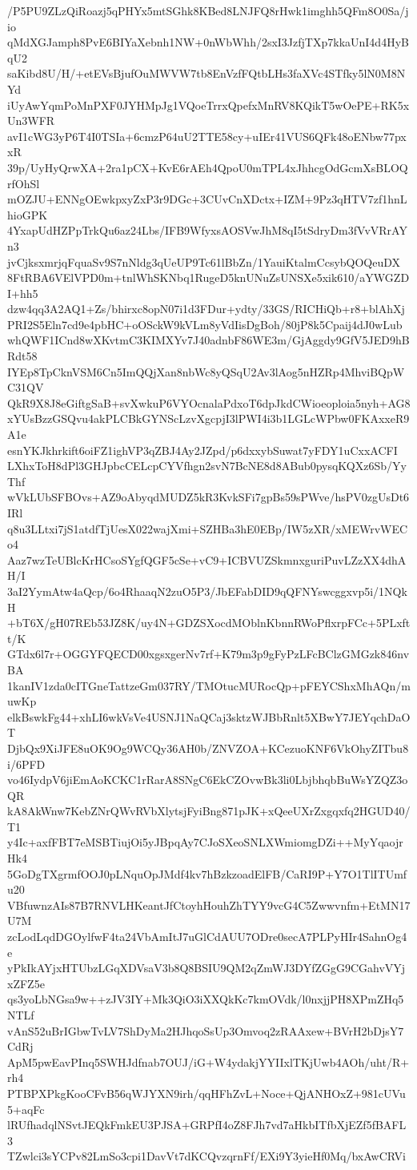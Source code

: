 /P5PU9ZLzQiRoazj5qPHYx5mtSGhk8KBed8LNJFQ8rHwk1imghh5QFm8O0Sa/jio
qMdXGJamph8PvE6BIYaXebnh1NW+0nWbWhh/2sxI3JzfjTXp7kkaUnI4d4HyBqU2
saKibd8U/H/+etEVsBjufOuMWVW7tb8EnVzfFQtbLHs3faXVc4STfky5lN0M8NYd
iUyAwYqmPoMnPXF0JYHMpJg1VQoeTrrxQpefxMnRV8KQikT5wOePE+RK5xUn3WFR
avI1cWG3yP6T4I0TSIa+6cmzP64uU2TTE58cy+uIEr41VUS6QFk48oENbw77pxxR
39p/UyHyQrwXA+2ra1pCX+KvE6rAEh4QpoU0mTPL4xJhhcgOdGcmXsBLOQrfOhSl
mOZJU+ENNgOEwkpxyZxP3r9DGc+3CUvCnXDctx+IZM+9Pz3qHTV7zf1hnLhioGPK
4YxapUdHZPpTrkQu6az24Lbs/IFB9WfyxsAOSVwJhM8qI5tSdryDm3fVvVRrAYn3
jvCjksxmrjqFquaSv9S7nNldg3qUeUP9Tc61lBbZn/1YauiKtalmCcsybQOQeuDX
8FtRBA6VElVPD0m+tnlWhSKNbq1RugeD5knUNuZsUNSXe5xik610/aYWGZDI+hh5
dzw4qq3A2AQ1+Zs/bhirxc8opN07i1d3FDur+ydty/33GS/RICHiQb+r8+blAhXj
PRI2S5Eln7cd9e4pbHC+oOSckW9kVLm8yVdIisDgBoh/80jP8k5Cpaij4dJ0wLub
whQWF1ICnd8wXKvtmC3KIMXYv7J40adnbF86WE3m/GjAggdy9GfV5JED9hBRdt58
IYEp8TpCknVSM6Cn5ImQQjXan8nbWc8yQSqU2Av3lAog5nHZRp4MhviBQpWC31QV
QkR9X8J8eGiftgSaB+svXwkuP6VYOcnalaPdxoT6dpJkdCWioeoploia5nyh+AG8
xYUsBzzGSQvu4akPLCBkGYNScLzvXgcpjI3lPWI4i3b1LGLcWPbw0FKAxxeR9A1e
esnYKJkhrkift6oiFZ1ighVP3qZBJ4Ay2JZpd/p6dxxybSuwat7yFDY1uCxxACFI
LXhxToH8dPl3GHJpbcCELcpCYVfhgn2svN7BcNE8d8ABub0pysqKQXz6Sb/YyThf
wVkLUbSFBOvs+AZ9oAbyqdMUDZ5kR3KvkSFi7gpBs59sPWve/hsPV0zgUsDt6IRl
q8u3LLtxi7jS1atdfTjUesX022wajXmi+SZHBa3hE0EBp/IW5zXR/xMEWrvWECo4
Aaz7wzTeUBlcKrHCsoSYgfQGF5cSe+vC9+ICBVUZSkmnxguriPuvLZzXX4dhAH/I
3aI2YymAtw4aQcp/6o4RhaaqN2zuO5P3/JbEFabDID9qQFNYswcggxvp5i/1NQkH
+bT6X/gH07REb53JZ8K/uy4N+GDZSXocdMOblnKbnnRWoPflxrpFCc+5PLxftt/K
GTdx6l7r+OGGYFQECD00xgsxgerNv7rf+K79m3p9gFyPzLFcBClzGMGzk846nvBA
1kanIV1zda0cITGneTattzeGm037RY/TMOtucMURocQp+pFEYCShxMhAQn/muwKp
elkBswkFg44+xhLI6wkVsVe4USNJ1NaQCaj3sktzWJBbRnlt5XBwY7JEYqchDaOT
DjbQx9XiJFE8uOK9Og9WCQy36AH0b/ZNVZOA+KCezuoKNF6VkOhyZITbu8i/6PFD
vo46IydpV6jiEmAoKCKC1rRarA8SNgC6EkCZOvwBk3li0LbjbhqbBuWsYZQZ3oQR
kA8AkWnw7KebZNrQWvRVbXlytsjFyiBng871pJK+xQeeUXrZxgqxfq2HGUD40/T1
y4Ic+axfFBT7eMSBTiujOi5yJBpqAy7CJoSXeoSNLXWmiomgDZi++MyYqaojrHk4
5GoDgTXgrmfOOJ0pLNquOpJMdf4kv7hBzkzoadElFB/CaRI9P+Y7O1TlITUmfu20
VBfuwnzAIs87B7RNVLHKeantJfCtoyhHouhZhTYY9vcG4C5Zwwvnfm+EtMN17U7M
zcLodLqdDGOylfwF4ta24VbAmItJ7uGlCdAUU7ODre0secA7PLPyHIr4SahnOg4e
yPkIkAYjxHTUbzLGqXDVsaV3b8Q8BSIU9QM2qZmWJ3DYfZGgG9CGahvVYjxZFZ5e
qs3yoLbNGsa9w++zJV3IY+Mk3QiO3iXXQkKc7kmOVdk/l0nxjjPH8XPmZHq5NTLf
vAnS52uBrIGbwTvLV7ShDyMa2HJhqoSsUp3Omvoq2zRAAxew+BVrH2bDjsY7CdRj
ApM5pwEavPInq5SWHJdfnab7OUJ/iG+W4ydakjYYIIxlTKjUwb4AOh/uht/R+rh4
PTBPXPkgKooCFvB56qWJYXN9irh/qqHFhZvL+Noce+QjANHOxZ+981cUVu5+aqFc
lRUfhadqlNSvtJEQkFmkEU3PJSA+GRPfI4oZ8FJh7vd7aHkbITfbXjEZf5fBAFL3
TZwlci3sYCPv82LmSo3cpi1DavVt7dKCQvzqrnFf/EXi9Y3yieHf0Mq/bxAwCRVi
